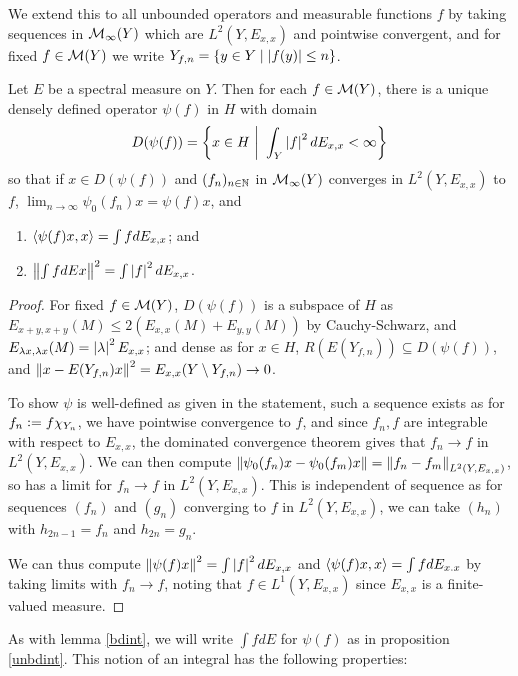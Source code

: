 \documentclass[10pt]{amsart}
\begin{document}
We extend this to all unbounded operators and measurable functions $f$ by taking sequences in $\mathcal{M}_\infty(Y)$ which are $L^2(Y, E_{x, x})$ and pointwise convergent, and for fixed $f \in \mathcal{M}(Y)$ we write $Y_{f, n} = \left\{  y \in Y \mid \left| f(y) \right| \leq n  \right\}$.
\begin{proposition}\label{unbdint}
    Let $E$ be a spectral measure on $Y$. Then for each $f \in \mathcal{M}(Y)$, there is a unique densely defined operator $\psi(f)$ in $H$ with domain
    $$
        D(\psi(f)) = \set{x \in H \ \bigg| \ \int_Y \abs{f}^2 dE_{x, x} < \infty}
    $$
    so that if $x \in D(\psi(f))$ and $(f_n)_{n \in \mathbb{N}}$ in $\mathcal{M}_\infty(Y)$ converges in $L^2(Y, E_{x, x})$ to $f$, $\lim_{n \to \infty}\psi_0(f_n)x = \psi(f)x$, and
    \begin{enumerate}
        \item $\left\langle \psi(f)x, x \right\rangle = \int f dE_{x, x}$; and
        \item $\left\| \int f dE x \right\|^2 = \int \left| f \right|^2 dE_{x, x}$.
    \end{enumerate}
\end{proposition}
\begin{proof}
    For fixed $f \in \mathcal{M}(Y)$, $D(\psi(f))$ is a subspace of $H$ as $E_{x + y, x + y}(M) \leq 2(E_{x, x}(M) + E_{y, y}(M))$ by Cauchy-Schwarz, and $E_{\lambda x, \lambda x}(M) = \left| \lambda \right|^2E_{x, x}$; and dense as for $x \in H$, $R(E(Y_{f, n})) \subseteq D(\psi(f))$, and $\left\| x - E(Y_{f, n})x \right\|^2 = E_{x, x}(Y \setminus Y_{f, n}) \to 0$. 
    
    To show $\psi$ is well-defined as given in the statement, such a sequence exists as for $f_n \vcentcolon= f \chi_{Y_n}$, we have pointwise convergence to $f$, and since $f_n, f$ are integrable with respect to $E_{x, x}$, the dominated convergence theorem gives that $f_n \to f$ in $L^2(Y, E_{x, x})$. We can then compute $\left\| \psi_0(f_n)x - \psi_0(f_m)x \right\| = \left\| f_n - f_m \right\|_{L^2(Y, E_{x, x})}$, so has a limit for $f_n \to f$ in $L^2(Y, E_{x, x})$. This is independent of sequence as for sequences $(f_n)$ and $(g_n)$ converging to $f$ in $L^2(Y, E_{x, x})$, we can take $(h_n)$ with $h_{2n - 1} = f_n$ and $h_{2n} = g_n$. 

    We can thus compute $\left\| \psi(f)x \right\|^2 = \int \left| f \right|^2dE_{x, x}$ and $\left\langle \psi(f)x, x \right\rangle = \int f dE_{x. x}$ by taking limits with $f_n \to f$, noting that $f \in L^1(Y, E_{x, x})$ since $E_{x, x}$ is a finite-valued measure.
\end{proof}
As with lemma \ref{bdint}, we will write $\int f dE$ for $\psi(f)$ as in proposition \ref{unbdint}. This notion of an integral has the following properties:
\end{document}
